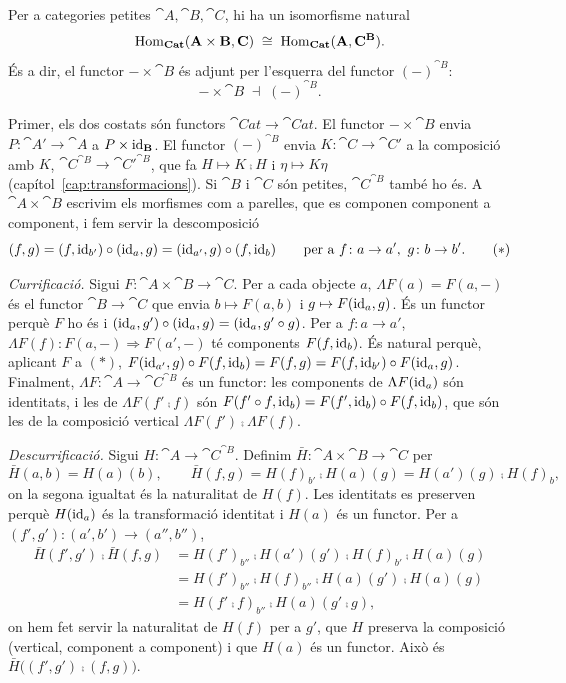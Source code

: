 \begin{proposicio}\label{prop:cat-currificacio}
Per a categories petites $\cat{A},\cat{B},\cat{C}$, hi ha un isomorfisme natural
\[
\operatorname{Hom}_{\mathbf{Cat}}(\mathbf{A}\times\mathbf{B},\mathbf{C})\;\cong\;\operatorname{Hom}_{\mathbf{Cat}}(\mathbf{A},\mathbf{C}^{\mathbf{B}}).
\]
És a dir, el functor $-\times\cat{B}$ és adjunt per l'esquerra del functor $(-)^{\cat{B}}$:
\[
-\times\cat{B}\;\dashv\;(-)^{\cat{B}}.
\]
\end{proposicio}

\begin{prova}
Primer, els dos costats són functors $\cat{Cat}\to\cat{Cat}$. El functor $-\times\cat{B}$ envia $P\colon\cat{A}'\to\cat{A}$ a $P\times\operatorname{id}_{\mathbf{B}}$. El functor $(-)^{\cat{B}}$ envia $K\colon\cat{C}\to\cat{C}'$ a la composició amb $K$, $\cat{C}^{\cat{B}}\to\cat{C}'^{\cat{B}}$, que fa $H\mapsto K\comp H$ i $\eta\mapsto K\eta$ (capítol~\ref{cap:transformacions}). Si $\cat{B}$ i $\cat{C}$ són petites, $\cat{C}^{\cat{B}}$ també ho és. A $\cat{A}\times\cat{B}$ escrivim els morfismes com a parelles, que es componen component a component, i fem servir la descomposició
\[
(f,g)=(f,\operatorname{id}_{b'})\circ(\operatorname{id}_a,g)=(\operatorname{id}_{a'},g)\circ(f,\operatorname{id}_b)\qquad\text{per a } f\colon a\to a',\ g\colon b\to b'.
\tag{$\ast$}
\]

\emph{Currificació.} Sigui $F\colon\cat{A}\times\cat{B}\to\cat{C}$. Per a cada objecte $a$, $\Lambda F(a)=F(a,-)$ és el functor $\cat{B}\to\cat{C}$ que envia $b\mapsto F(a,b)$ i $g\mapsto F(\operatorname{id}_a,g)$. És un functor perquè $F$ ho és i $(\operatorname{id}_a,g')\circ(\operatorname{id}_a,g)=(\operatorname{id}_a,g'\circ g)$. Per a $f\colon a\to a'$, $\Lambda F(f)\colon F(a,-)\Rightarrow F(a',-)$ té components $F(f,\operatorname{id}_b)$. És natural perquè, aplicant $F$ a $(\ast)$, $F(\operatorname{id}_{a'},g)\circ F(f,\operatorname{id}_b)=F(f,g)=F(f,\operatorname{id}_{b'})\circ F(\operatorname{id}_a,g)$. Finalment, $\Lambda F\colon\cat{A}\to\cat{C}^{\cat{B}}$ és un functor: les components de $\Lambda F(\operatorname{id}_a)$ són identitats, i les de $\Lambda F(f'\comp f)$ són $F(f'\circ f,\operatorname{id}_b)=F(f',\operatorname{id}_b)\circ F(f,\operatorname{id}_b)$, que són les de la composició vertical $\Lambda F(f')\comp\Lambda F(f)$.

\emph{Descurrificació.} Sigui $H\colon\cat{A}\to\cat{C}^{\cat{B}}$. Definim $\bar H\colon\cat{A}\times\cat{B}\to\cat{C}$ per
\[
\bar H(a,b)=H(a)(b),\qquad \bar H(f,g)=H(f)_{b'}\comp H(a)(g)=H(a')(g)\comp H(f)_b,
\]
on la segona igualtat és la naturalitat de $H(f)$. Les identitats es preserven perquè $H(\operatorname{id}_a)$ és la transformació identitat i $H(a)$ és un functor. Per a $(f',g')\colon(a',b')\to(a'',b'')$,
\[
\begin{aligned}
\bar H(f',g')\comp\bar H(f,g)
&=H(f')_{b''}\comp H(a')(g')\comp H(f)_{b'}\comp H(a)(g)\\
&=H(f')_{b''}\comp H(f)_{b''}\comp H(a)(g')\comp H(a)(g)\\
&=H(f'\comp f)_{b''}\comp H(a)(g'\comp g),
\end{aligned}
\]
on hem fet servir la naturalitat de $H(f)$ per a $g'$, que $H$ preserva la composició (vertical, component a component) i que $H(a)$ és un functor. Això és $\bar H\bigl((f',g')\comp(f,g)\bigr)$.


\end{prova}
